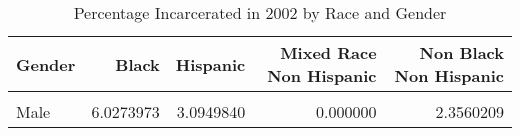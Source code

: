 \begin{table}[H]

\caption{\label{tab:tab:summarystats}Percentage Incarcerated in 2002 by Race and Gender}
\centering
\begin{tabular}[t]{lrrrr}
\toprule
Gender & Black & Hispanic & Mixed Race Non Hispanic & Non Black Non Hispanic\\
\midrule
\cellcolor{gray!6}{Female} & \cellcolor{gray!6}{0.7922535} & \cellcolor{gray!6}{0.6622517} & \cellcolor{gray!6}{2.380952} & \cellcolor{gray!6}{0.5979761}\\
Male & 6.0273973 & 3.0949840 & 0.000000 & 2.3560209\\
\bottomrule
\end{tabular}
\end{table}
